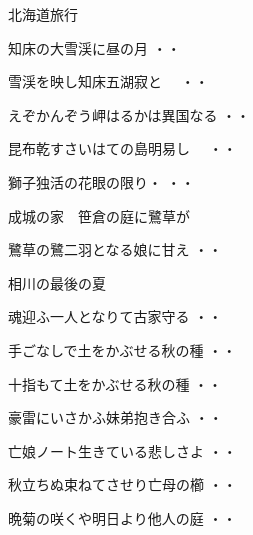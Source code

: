 \vspace{0.6cm}
北海道旅行
\begin{shiika}知床の大雪渓に昼の月
\hfill{・・}\end{shiika}
\begin{shiika}雪渓を映し知床五湖寂と　
\hfill{・・}\end{shiika}
\begin{shiika}えぞかんぞう岬はるかは異国なる
\hfill{・・}\end{shiika}
\begin{shiika}昆布乾すさいはての島明易し　
\hfill{・・}\end{shiika}
\begin{shiika}獅子独活の花眼の限り・
\hfill{・・}\end{shiika}
\vspace{0.6cm}
成城の家　笹倉の庭に鷺草が
\begin{shiika}鷺草の鷺二羽となる娘に甘え
\hfill{・・}\end{shiika}
\vspace{0.6cm}
相川の最後の夏
\begin{shiika}魂迎ふ一人となりて古家守る
\hfill{・・}\end{shiika}
\vspace{0.6cm}
\begin{shiika}手ごなしで土をかぶせる秋の種
\hfill{・・}\end{shiika}
\begin{shiika}十指もて土をかぶせる秋の種
\hfill{・・}\end{shiika}
\begin{shiika}豪雷にいさかふ妹弟抱き合ふ
\hfill{・・}\end{shiika}
\begin{shiika}亡娘ノート生きている悲しさよ
\hfill{・・}\end{shiika}
\begin{shiika}秋立ちぬ束ねてさせり亡母の櫛
\hfill{・・}\end{shiika}
\begin{shiika}晩菊の咲くや明日より他人の庭
\hfill{・・}\end{shiika}
